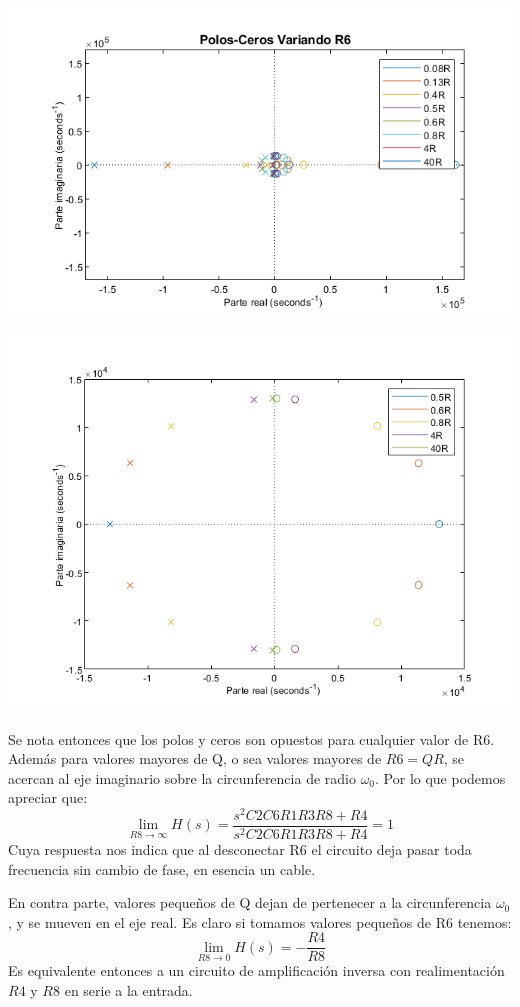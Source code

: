 \begin{itemize}
    \begin{minipage}{\textwidth}
    \centering
    \includegraphics[scale = 0.8]{../Ejercicio1-FiltroConGIC/Informe/polor6.png}
    \end{minipage}
    \begin{minipage}{\textwidth}
    \centering
    \includegraphics[scale = 0.7]{../Ejercicio1-FiltroConGIC/Informe/polor6-1.png}
    \end{minipage}
    
    Se nota entonces que los polos y ceros son opuestos para cualquier valor de R6. Además para valores mayores de Q, o sea valores mayores de $R6 = QR$, se acercan al eje imaginario sobre la circunferencia de radio $\omega_0$. Por lo que podemos apreciar que:
    $$\lim_{R8\longrightarrow\infty} H(s) = \frac{s^2C2C6R1R3R8 + R4}{s^2C2C6R1R3R8 + R4} = 1$$
    Cuya respuesta nos indica que al desconectar R6 el circuito deja pasar toda frecuencia sin cambio de fase, en esencia un cable. 
    
    En contra parte, valores pequeños de Q dejan de pertenecer a la circunferencia $\omega_0$, y se mueven en el eje real. Es claro si tomamos valores pequeños de R6 tenemos:
    $$\lim_{R8\longrightarrow 0} H(s) = -\frac{R4}{R8}$$
    Es equivalente entonces a un circuito de amplificación inversa con realimentación $R4$ y $R8$ en serie a la entrada. 
    
\end{itemize}


